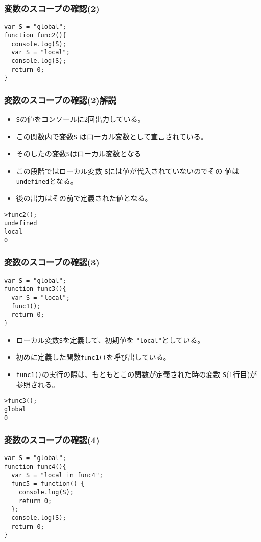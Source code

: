 \begin{frame}[containsverbatim]
\frametitle{変数のスコープの確認(2)}
\begin{Verbatim}
var S = "global";
function func2(){
  console.log(S);
  var S = "local";
  console.log(S);
  return 0;
}
\end{Verbatim}
\end{frame}
\begin{frame}[containsverbatim]
\frametitle{変数のスコープの確認(2)解説}
\begin{itemize}
 \item \Verb+S+の値をコンソールに2回出力している。
 \item この関数内で変数\Verb+S+ はローカル変数として宣言されている。
 \item そのしたの変数\Verb+S+はローカル変数となる
  \item この段階ではローカル変数 \Verb+S+には値が代入されていないのでその
       値は\Verb+undefined+となる。
 \item 後の出力はその前で定義された値となる。
\end{itemize}
\begin{Verbatim}
>func2();
undefined
local    
0
\end{Verbatim}
\end{frame}
\begin{frame}[containsverbatim]
\frametitle{変数のスコープの確認(3)}
\begin{Verbatim}
var S = "global";
function func3(){
  var S = "local";
  func1();
  return 0;
}
\end{Verbatim}
\begin{itemize}
 \item ローカル変数\Verb+S+を定義して、初期値を
       \Verb+"local"+としている。
 \item 初めに定義した関数\Verb+func1()+を呼び出している。
 \item \Verb+func1()+の実行の際は、もともとこの関数が定義された時の変数
       \Verb+S+(1行目)が参照される。
\end{itemize}
\begin{Verbatim}
>func3();
global
0
\end{Verbatim}
\end{frame}
\begin{frame}[containsverbatim]
\frametitle{変数のスコープの確認(4)}
\begin{Verbatim}
var S = "global";
function func4(){
  var S = "local in func4";
  func5 = function() {
    console.log(S);
    return 0;
  };
  console.log(S);
  return 0;
}
\end{Verbatim}
\end{frame}

